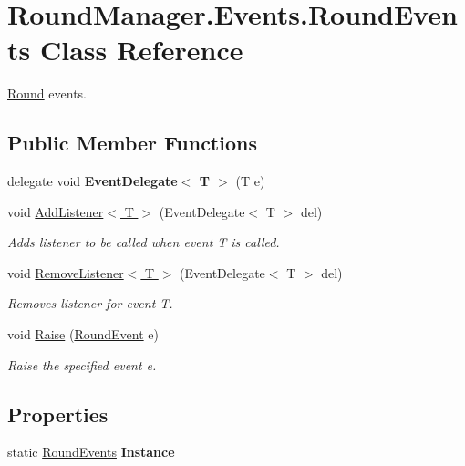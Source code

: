 \hypertarget{class_round_manager_1_1_events_1_1_round_events}{}\section{Round\+Manager.\+Events.\+Round\+Events Class Reference}
\label{class_round_manager_1_1_events_1_1_round_events}


\hyperlink{class_round_manager_1_1_round}{Round} events.  


\subsection*{Public Member Functions}
\begin{DoxyCompactItemize}
\item 
\hypertarget{class_round_manager_1_1_events_1_1_round_events_a404697d7bfa1534d64e17e3dc3ecbdf8}{}delegate void {\bfseries Event\+Delegate$<$ T $>$} (T e)\label{class_round_manager_1_1_events_1_1_round_events_a404697d7bfa1534d64e17e3dc3ecbdf8}

\item 
void \hyperlink{class_round_manager_1_1_events_1_1_round_events_a34bda04dba8f8a5a0fde082a4c2823d3}{Add\+Listener$<$ T $>$} (Event\+Delegate$<$ T $>$ del)
\begin{DoxyCompactList}\small\item\em Adds listener to be called when event T is called. \end{DoxyCompactList}\item 
void \hyperlink{class_round_manager_1_1_events_1_1_round_events_a3275fd627fca28d6ffdea7c9eb0e56a2}{Remove\+Listener$<$ T $>$} (Event\+Delegate$<$ T $>$ del)
\begin{DoxyCompactList}\small\item\em Removes listener for event T. \end{DoxyCompactList}\item 
void \hyperlink{class_round_manager_1_1_events_1_1_round_events_a477082a157f8299656ecae23ff0374b6}{Raise} (\hyperlink{class_round_manager_1_1_events_1_1_round_event}{Round\+Event} e)
\begin{DoxyCompactList}\small\item\em Raise the specified event e. \end{DoxyCompactList}\end{DoxyCompactItemize}
\subsection*{Properties}
\begin{DoxyCompactItemize}
\item 
\hypertarget{class_round_manager_1_1_events_1_1_round_events_a94365cd37c47643872a276fe8d476e95}{}static \hyperlink{class_round_manager_1_1_events_1_1_round_events}{Round\+Events} {\bfseries Instance}\label{class_round_manager_1_1_events_1_1_round_events_a94365cd37c47643872a276fe8d476e95}

\end{DoxyCompactItemize}


